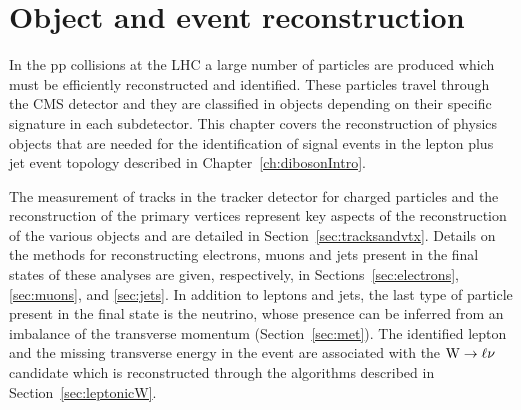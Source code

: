 \chapter{Object and event reconstruction}
\label{ch:EventReconstruction}

In the pp collisions at the LHC a large number of particles are produced which must be efficiently reconstructed and identified. These particles travel through the CMS detector and they are classified in objects depending on their specific signature in each subdetector. This chapter covers the reconstruction of physics objects that are needed for the identification of signal events in the lepton plus jet event topology described in Chapter~\ref{ch:dibosonIntro}.

The measurement of tracks in the tracker detector for charged particles and the reconstruction of the primary vertices represent key aspects of the reconstruction of the various objects and are detailed in Section~\ref{sec:tracksandvtx}. Details on the methods for reconstructing electrons, muons and jets present in the final states of these analyses are given, respectively, in Sections~\ref{sec:electrons}, \ref{sec:muons}, and \ref{sec:jets}. %
In addition to leptons and jets, the last type of particle present in the final state is the neutrino, whose presence can be inferred from an imbalance of the transverse momentum (Section~\ref{sec:met}).
The identified lepton and the missing transverse energy in the event are associated with the $\mathrm{W}\to\ell\nu$ candidate which is reconstructed through the algorithms described in Section~\ref{sec:leptonicW}.

 
 
 
 
